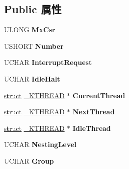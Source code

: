 \subsection*{Public 属性}
\begin{DoxyCompactItemize}
\item 
\mbox{\label{struct___k_p_r_c_b_a4ec3a38611c9ea7c126832645074a469}} 
U\+L\+O\+NG {\bfseries Mx\+Csr}
\item 
\mbox{\label{struct___k_p_r_c_b_aadc1c5ccf153f678106367032be551ed}} 
U\+S\+H\+O\+RT {\bfseries Number}
\item 
\mbox{\label{struct___k_p_r_c_b_a35685b1483a89704ddef809447dc4af4}} 
U\+C\+H\+AR {\bfseries Interrupt\+Request}
\item 
\mbox{\label{struct___k_p_r_c_b_a1014c3c94f4a654d8c891afe6f9592f8}} 
U\+C\+H\+AR {\bfseries Idle\+Halt}
\item 
\mbox{\label{struct___k_p_r_c_b_a9e56ed8938c7bdb88e724d08f783a9d5}} 
\hyperlink{interfacestruct}{struct} \hyperlink{struct___k_t_h_r_e_a_d}{\+\_\+\+K\+T\+H\+R\+E\+AD} $\ast$ {\bfseries Current\+Thread}
\item 
\mbox{\label{struct___k_p_r_c_b_a9f74f9a8b2d29973c44279a3bb3f365f}} 
\hyperlink{interfacestruct}{struct} \hyperlink{struct___k_t_h_r_e_a_d}{\+\_\+\+K\+T\+H\+R\+E\+AD} $\ast$ {\bfseries Next\+Thread}
\item 
\mbox{\label{struct___k_p_r_c_b_a1a0a4dc092619848bae9eb0c4f8235b8}} 
\hyperlink{interfacestruct}{struct} \hyperlink{struct___k_t_h_r_e_a_d}{\+\_\+\+K\+T\+H\+R\+E\+AD} $\ast$ {\bfseries Idle\+Thread}
\item 
\mbox{\label{struct___k_p_r_c_b_a28f7edb19d1710b1adab40465d2bb4b4}} 
U\+C\+H\+AR {\bfseries Nesting\+Level}
\item 
\mbox{\label{struct___k_p_r_c_b_a6ccc724ec9e50957f015aff140bc394d}} 
U\+C\+H\+AR {\bfseries Group}
\item 
\mbox{\label{struct___k_p_r_c_b_a7cc5bd52bfb68e7aaded76c21f06e63a}} 

\end{DoxyCompactItemize}
